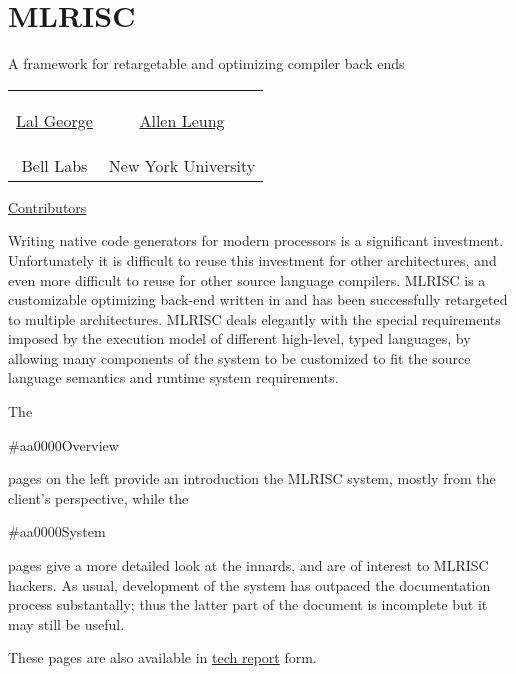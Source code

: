 \section{MLRISC}
  \begin{center} 
    \begin{Bold}
     A framework for retargetable and optimizing compiler back ends 
    \end{Bold}
  \end{center}
\begin{center}
  \begin{tabular}{cc} 
    \begin{address}
      \href{mailto:george@research.bell-labs.com}{Lal George} 
    \end{address} &
    \begin{address}
      \href{mailto:leunga@cs.nyu.edu}{ Allen Leung}
    \end{address} \\
       Bell Labs & New York University \\
  \end{tabular}   
\end{center}

\begin{center}

\begin{Italics}
   \href{contributors.html}{Contributors}
\end{Italics}
\end{center}

Writing native code generators for modern processors is a significant
investment.  Unfortunately it is difficult
to reuse this investment for other architectures, and even more
difficult to reuse for other source language compilers.   MLRISC is
a customizable optimizing back-end written in
and has been successfully retargeted to multiple architectures.
MLRISC deals elegantly with the special requirements imposed by the
execution model of different high-level, typed languages, by allowing
many components of the system to be customized to fit the source language
semantics and runtime system requirements.

The \begin{color}{#aa0000}Overview\end{color} pages on the left provide 
an introduction the MLRISC system, mostly from the client's perspective,  
while the \begin{color}{#aa0000}System\end{color}
pages give a more detailed look at the 
innards, and are of interest to MLRISC hackers.   As usual, development of
the system has outpaced the documentation process substantally; thus
the latter part of the document is incomplete but it may still be useful. 

These pages are also available in 
\href{../latex/mlrisc.ps}{tech report} form.
